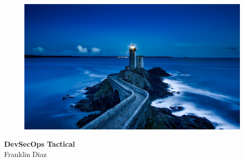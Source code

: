 \begin{titlepage}
    \centering
        \vspace{0mm}
            \begin{figure}[!h]
                \centering
                \includegraphics[scale=1.0]{../images/plouzane-1758197_1920.jpg}
            \end{figure}
        \vspace*{40mm} %
        \begin{flushright}
            \textbf{\textsf{\Huge {DevSecOps Tactical}}}\\
            \vspace{5mm}
            \Large \textsf{Franklin Diaz}\\
            \vspace*{0mm}
        \end{flushright}
	\clearpage
		\vspace*{\fill}

\end{titlepage}

